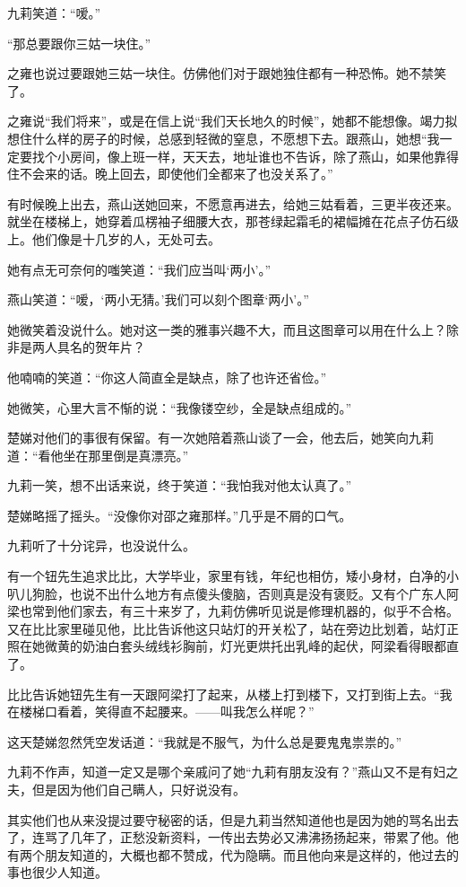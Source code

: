 \par 九莉笑道：“嗳。”
\par “那总要跟你三姑一块住。”
\par 之雍也说过要跟她三姑一块住。仿佛他们对于跟她独住都有一种恐怖。她不禁笑了。
\par 之雍说“我们将来”，或是在信上说“我们天长地久的时候”，她都不能想像。竭力拟想住什么样的房子的时候，总感到轻微的窒息，不愿想下去。跟燕山，她想“我一定要找个小房间，像上班一样，天天去，地址谁也不告诉，除了燕山，如果他靠得住不会来的话。晚上回去，即使他们全都来了也没关系了。”
\par 有时候晚上出去，燕山送她回来，不愿意再进去，给她三姑看着，三更半夜还来。就坐在楼梯上，她穿着瓜楞袖子细腰大衣，那苍绿起霜毛的裙幅摊在花点子仿石级上。他们像是十几岁的人，无处可去。
\par 她有点无可奈何的嗤笑道：“我们应当叫‘两小’。”
\par 燕山笑道：“嗳，‘两小无猜。’我们可以刻个图章‘两小’。”
\par 她微笑着没说什么。她对这一类的雅事兴趣不大，而且这图章可以用在什么上？除非是两人具名的贺年片？
\par 他喃喃的笑道：“你这人简直全是缺点，除了也许还省俭。”
\par 她微笑，心里大言不惭的说：“我像镂空纱，全是缺点组成的。”
\par 楚娣对他们的事很有保留。有一次她陪着燕山谈了一会，他去后，她笑向九莉道：“看他坐在那里倒是真漂亮。”
\par 九莉一笑，想不出话来说，终于笑道：“我怕我对他太认真了。”
\par 楚娣略摇了摇头。“没像你对邵之雍那样。”几乎是不屑的口气。
\par 九莉听了十分诧异，也没说什么。
\par 有一个钮先生追求比比，大学毕业，家里有钱，年纪也相仿，矮小身材，白净的小叭儿狗脸，也说不出什么地方有点傻头傻脑，否则真是没有褒贬。又有个广东人阿梁也常到他们家去，有三十来岁了，九莉仿佛听见说是修理机器的，似乎不合格。又在比比家里碰见他，比比告诉他这只站灯的开关松了，站在旁边比划着，站灯正照在她微黄的奶油白套头绒线衫胸前，灯光更烘托出乳峰的起伏，阿梁看得眼都直了。
\par 比比告诉她钮先生有一天跟阿梁打了起来，从楼上打到楼下，又打到街上去。“我在楼梯口看着，笑得直不起腰来。——叫我怎么样呢？”
\par 这天楚娣忽然凭空发话道：“我就是不服气，为什么总是要鬼鬼祟祟的。”
\par 九莉不作声，知道一定又是哪个亲戚问了她“九莉有朋友没有？”燕山又不是有妇之夫，但是因为他们自己瞒人，只好说没有。
\par 其实他们也从来没提过要守秘密的话，但是九莉当然知道他也是因为她的骂名出去了，连骂了几年了，正愁没新资料，一传出去势必又沸沸扬扬起来，带累了他。他有两个朋友知道的，大概也都不赞成，代为隐瞒。而且他向来是这样的，他过去的事也很少人知道。
